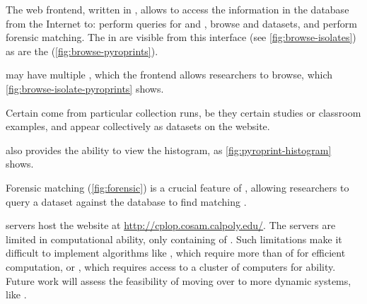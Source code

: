 The web frontend, written in \php{}, allows \cplop{} to access the information in the database from the Internet to: perform queries for \isols{} and \pyros{}, browse \isol{} and \pyro{} datasets, and perform forensic matching. 
The \isols{} in \cplop{} are visible from this interface (see \autoref{fig:browse-isolates}) as are the \pyros{} (\autoref{fig:browse-pyroprints}).

\Isols{} may have multiple \pyros{}, which the \cplop{} frontend allows researchers to browse, which \autoref{fig:browse-isolate-pyroprints} shows.

Certain \isols{} come from particular collection runs, be they certain studies or classroom examples, and appear collectively as datasets on the website.

\cplop{} also provides the ability to view the \pyro{} histogram, as \autoref{fig:pyroprint-histogram} shows.

Forensic matching (\autoref{fig:forensic}) is a crucial feature of \cplop{}, allowing researchers to query a dataset against the \cplop{} database to find matching \isols{}.


\cp{} servers host the \cplop{} website at \url{http://cplop.cosam.calpoly.edu/}.
The servers are limited in computational ability, only containing  of \ram{}.
Such limitations make it difficult to implement algorithms like \ohclust{} \cite{montana2013algorithms, montana2013ontological, montana2012investigating}, which require more than  of \ram{} for efficient computation, or \cite{adams2016using}, which requires access to a cluster of computers for \mapreduce{} ability.
Future work will assess the feasibility of moving over to more dynamic systems, like \awslong{}.